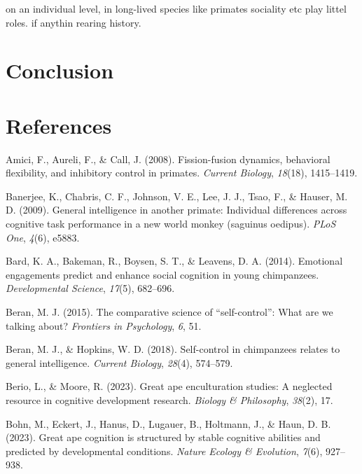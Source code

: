 \documentclass[
  man,floatsintext]{apa6}
\newlength{\cslhangindent}
\newlength{\cslentryspacingunit} %
\newenvironment{CSLReferences}[2] %
 {%
  \setlength{\parindent}{0pt}
  \ifodd #1
  \let\oldpar\par
  \def\par{\hangindent=\cslhangindent\oldpar}
  \fi
  \setlength{\parskip}{#2\cslentryspacingunit}
 }%
 {}
\begin{document}
on an individual level, in long-lived species like primates sociality etc play littel roles. if anythin rearing history.

\hypertarget{conclusion}{%
\section{Conclusion}\label{conclusion}}

\newpage

\hypertarget{references}{%
\section{References}\label{references}}

\hypertarget{refs}{}
\begin{CSLReferences}{1}{0}
\leavevmode{}%
Amici, F., Aureli, F., \& Call, J. (2008). Fission-fusion dynamics, behavioral flexibility, and inhibitory control in primates. \emph{Current Biology}, \emph{18}(18), 1415--1419.

\leavevmode{}%
Banerjee, K., Chabris, C. F., Johnson, V. E., Lee, J. J., Tsao, F., \& Hauser, M. D. (2009). General intelligence in another primate: Individual differences across cognitive task performance in a new world monkey (saguinus oedipus). \emph{PLoS One}, \emph{4}(6), e5883.

\leavevmode{}%
Bard, K. A., Bakeman, R., Boysen, S. T., \& Leavens, D. A. (2014). Emotional engagements predict and enhance social cognition in young chimpanzees. \emph{Developmental Science}, \emph{17}(5), 682--696.

\leavevmode{}%
Beran, M. J. (2015). The comparative science of {``self-control''}: What are we talking about? \emph{Frontiers in Psychology}, \emph{6}, 51.

\leavevmode{}%
Beran, M. J., \& Hopkins, W. D. (2018). Self-control in chimpanzees relates to general intelligence. \emph{Current Biology}, \emph{28}(4), 574--579.

\leavevmode{}%
Berio, L., \& Moore, R. (2023). Great ape enculturation studies: A neglected resource in cognitive development research. \emph{Biology \& Philosophy}, \emph{38}(2), 17.

\leavevmode{}%
Bohn, M., Eckert, J., Hanus, D., Lugauer, B., Holtmann, J., \& Haun, D. B. (2023). Great ape cognition is structured by stable cognitive abilities and predicted by developmental conditions. \emph{Nature Ecology \& Evolution}, \emph{7}(6), 927--938.


\end{CSLReferences}
\end{document}
